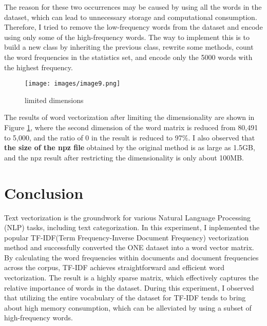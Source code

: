 \documentclass[12pt]{article}
\begin{document}
The reason for these two occurrences may be caused by using all the words in the dataset, which can lead to unnecessary storage and computational consumption. Therefore, I tried to remove the low-frequency words from the dataset and encode using only some of the high-frequency words. The way to implement this is to build a new class by inheriting the previous class, rewrite some methods, count the word frequencies in the statistics set, and encode only the 5000 words with the highest frequency.

\begin{figure}[h]  %
    \centering     %
    \texttt{[image: images/image9.png]}
    \caption{limited dimensions}  %
    \label{fig:image1.9}  %
\end{figure}

The results of word vectorization after limiting the dimensionality are shown in Figure \ref{fig:image1.9}, where the second dimension of the word matrix is reduced from 80,491 to 5,000, and the ratio of 0 in the result is reduced to 97\%. I also observed that \textbf{the size of the npz file} obtained by the original method is as large as 1.5GB, and the npz result after restricting the dimensionality is only about 100MB.

\section{Conclusion}
Text vectorization is the groundwork for various Natural Language Processing (NLP) tasks, including text categorization. In this experiment, I inplemented the popular TF-IDF(Term Frequency-Inverse Document Frequency)  vectorization method and successfully converted the ONE dataset into a word vector matrix. By calculating the word frequencies within documents and document frequencies across the corpus, TF-IDF achieves straightforward and efficient word vectorization.
The result is a highly sparse matrix, which effectively captures the relative importance of words in the dataset.
During this experiment, I observed that utilizing the entire vocabulary of the dataset for TF-IDF tends to bring about high memory consumption, which can be alleviated by using a subset of high-frequency words.



\end{document}
